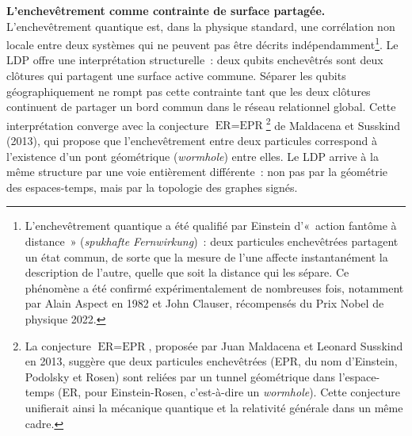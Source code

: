\documentclass[12pt, a4paper, openright]{book}
\begin{document}
\medskip

\textbf{L'enchevêtrement comme contrainte de surface partagée.} L'enchevêtrement quantique est, dans la physique standard, une corrélation non locale entre deux systèmes qui ne peuvent pas être décrits indépendamment\footnote{L'enchevêtrement quantique a été qualifié par Einstein d'«~action fantôme à distance~» (\textit{spukhafte Fernwirkung})~: deux particules enchevêtrées partagent un état commun, de sorte que la mesure de l'une affecte instantanément la description de l'autre, quelle que soit la distance qui les sépare. Ce phénomène a été confirmé expérimentalement de nombreuses fois, notamment par Alain Aspect en 1982 et John Clauser, récompensés du Prix Nobel de physique 2022.}. Le LDP offre une interprétation structurelle~: deux qubits enchevêtrés sont deux clôtures qui partagent une surface active commune. Séparer les qubits géographiquement ne rompt pas cette contrainte tant que les deux clôtures continuent de partager un bord commun dans le réseau relationnel global. Cette interprétation converge avec la conjecture $\text{ER} = \text{EPR}$\footnote{La conjecture $\text{ER} = \text{EPR}$, proposée par Juan Maldacena et Leonard Susskind en 2013, suggère que deux particules enchevêtrées (EPR, du nom d'Einstein, Podolsky et Rosen) sont reliées par un tunnel géométrique dans l'espace-temps (ER, pour Einstein-Rosen, c'est-à-dire un \textit{wormhole}). Cette conjecture unifierait ainsi la mécanique quantique et la relativité générale dans un même cadre.} de Maldacena et Susskind (2013), qui propose que l'enchevêtrement entre deux particules correspond à l'existence d'un pont géométrique (\emph{wormhole}) entre elles. Le LDP arrive à la même structure par une voie entièrement différente~: non pas par la géométrie des espaces-temps, mais par la topologie des graphes signés.

\medskip
\end{document}
